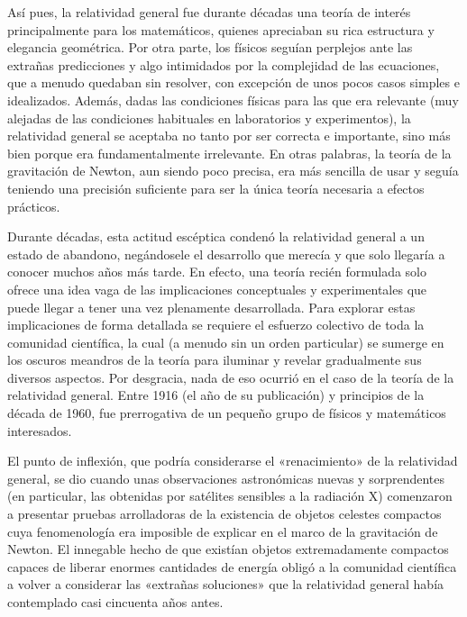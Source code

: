Así pues, la relatividad general fue durante décadas una teoría de interés
principalmente para los matemáticos, quienes apreciaban su rica estructura y
elegancia geométrica. Por otra parte, los físicos seguían perplejos ante las
extrañas predicciones y algo intimidados por la complejidad de las ecuaciones, que
a menudo quedaban sin resolver, con excepción de unos pocos casos simples e
idealizados. Además, dadas las condiciones físicas para las que era relevante
(muy alejadas de las condiciones habituales en laboratorios y experimentos), la
relatividad general se aceptaba no tanto por ser correcta e importante, sino más
bien porque era fundamentalmente irrelevante. En otras palabras, la teoría de la
gravitación de Newton, aun siendo poco precisa, era más sencilla de usar y seguía
teniendo una precisión suficiente para ser la única teoría necesaria a efectos
prácticos.

Durante décadas, esta actitud escéptica condenó la relatividad general a un estado
de abandono, negándosele el desarrollo que merecía y que solo llegaría a conocer
muchos años más tarde. En efecto, una teoría recién formulada solo ofrece una idea
vaga de las implicaciones conceptuales y experimentales que puede llegar a tener
una vez plenamente desarrollada. Para explorar estas implicaciones de forma
detallada se requiere el esfuerzo colectivo de toda la comunidad científica, la
cual (a menudo sin un orden particular) se sumerge en los oscuros meandros de la
teoría para iluminar y revelar gradualmente sus diversos aspectos. Por desgracia,
nada de eso ocurrió en el caso de la teoría de la relatividad general. Entre 1916
(el año de su publicación) y principios de la década de 1960, fue prerrogativa de
un pequeño grupo de físicos y matemáticos interesados.

El punto de inflexión, que podría considerarse el «renacimiento» de la relatividad
general, se dio cuando unas observaciones astronómicas
nuevas y sorprendentes (en particular, las obtenidas por satélites sensibles a la
radiación X) comenzaron a presentar
pruebas arrolladoras de la existencia de objetos celestes compactos cuya
fenomenología era imposible de explicar en el marco de la gravitación de Newton.
El innegable hecho de que existían objetos extremadamente compactos capaces de
liberar enormes cantidades de energía obligó a la comunidad científica a volver a
considerar las «extrañas soluciones» que la relatividad general había contemplado
casi cincuenta años antes.


